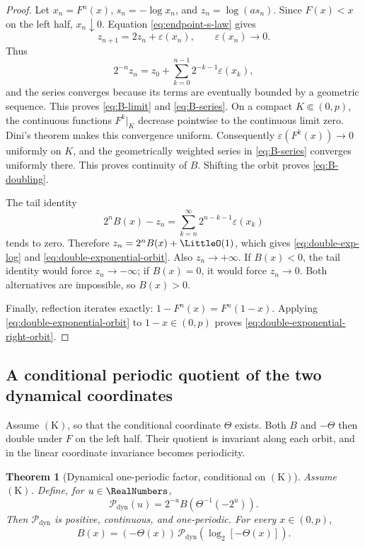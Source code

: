 \documentclass[11pt,oneside]{article}
\newtheorem{theorem}{Theorem}[section]
\theoremstyle{definition}
\theoremstyle{remark}
\begin{document}
\begin{proof}
Let \(x_n=F^n(x)\), \(s_n=-\log x_n\), and \(z_n=\log(as_n)\).  Since \(F(x)<x\) on the
left half, \(x_n\downarrow0\).  Equation \eqref{eq:endpoint-s-law} gives
\begin{equation}
 z_{n+1}=2z_n+\varepsilon(x_n),
 \qquad \varepsilon(x_n)\to0.
 \label{eq:z-recurrence}
\end{equation}
Thus
\[
 2^{-n}z_n=z_0+\sum_{k=0}^{n-1}2^{-k-1}\varepsilon(x_k),
\]
and the series converges because its terms are eventually bounded by a geometric sequence.
This proves \eqref{eq:B-limit} and \eqref{eq:B-series}.  On a compact
\(K\Subset(0,p)\), the continuous functions \(F^k|_K\) decrease pointwise to the continuous
limit zero.  Dini's theorem makes this convergence uniform.  Consequently
\(\varepsilon(F^k(x))\to0\) uniformly on \(K\), and the geometrically weighted series in
\eqref{eq:B-series} converges uniformly there.  This proves continuity of \(B\).  Shifting
the orbit proves \eqref{eq:B-doubling}.

The tail identity
\[
 2^nB(x)-z_n
 =\sum_{k=n}^{\infty}2^{n-k-1}\varepsilon(x_k)
\]
tends to zero.  Therefore \(z_n=2^nB(x)+\LittleO(1)\), which gives
\eqref{eq:double-exp-log} and \eqref{eq:double-exponential-orbit}.  Also \(z_n\to+\infty\).
If \(B(x)<0\), the tail identity would force \(z_n\to-\infty\); if \(B(x)=0\), it would force
\(z_n\to0\).  Both alternatives are impossible, so \(B(x)>0\).

Finally, reflection iterates exactly:
\(
 1-F^n(x)=F^n(1-x)
\).
Applying \eqref{eq:double-exponential-orbit} to \(1-x\in(0,p)\) proves
\eqref{eq:double-exponential-right-orbit}.
\end{proof}

\subsection{A conditional periodic quotient of the two dynamical coordinates}

Assume \(\mathrm{(K)}\), so that the conditional coordinate \(\Theta\) exists.  Both \(B\) and
\(-\Theta\) then double under \(F\) on the left half.  Their quotient is invariant along each
orbit, and in the linear coordinate invariance becomes periodicity.

\begin{theorem}[Dynamical one-periodic factor, conditional on \(\mathrm{(K)}\)]
\label{thm:dynamical-periodic}
Assume \(\mathrm{(K)}\).  Define, for \(u\in\RealNumbers\),
\begin{equation}
 \mathcal P_{\mathrm{dyn}}(u)
 =2^{-u}B\!\left(\Theta^{-1}(-2^u)\right).
 \label{eq:Pdyn-def}
\end{equation}
Then \(\mathcal P_{\mathrm{dyn}}\) is positive, continuous, and one-periodic.  For every
\(x\in(0,p)\),
\begin{equation}
 \boxed{\displaystyle
 B(x)=(-\Theta(x))\,
 \mathcal P_{\mathrm{dyn}}\!\left(\log_2[-\Theta(x)]\right).}
 \label{eq:B-theta-periodic}
\end{equation}
\end{theorem}
\end{document}
